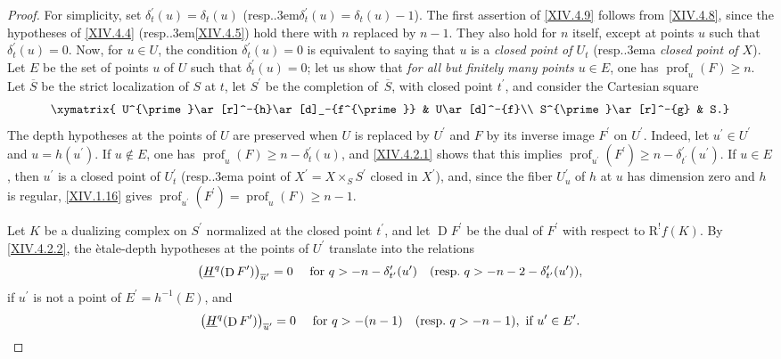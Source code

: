 \documentclass[11pt,a4paper,oneside]{book}
\providecommand{\pageoriginale}{%
  \refstepcounter{pageoriginal}%
  \marginpar{\raggedright\footnotesize\bfseries\thepageoriginal}%
  \xspace}
\providecommand{\resp}{resp.\kern.3em}
\DeclareMathOperator{\D}{D}
\providecommand{\prof}{\operatorname{prof}}
\providecommand{\R}{\mathrm R}
\theoremstyle{plain}
\theoremstyle{definition}
\theoremstyle{remark}
\renewcommand{\Ref}[1]{\textup{\ref{#1}}}
\begin{document}
\begin{proof}
For simplicity, set $\delta_{t}^{\prime}(u)=\delta_{t}(u)$ (\resp $\delta_{t}^{\prime}(u)=\delta_{t}(u)-1$). The first assertion of \Ref{XIV.4.9} follows from \Ref{XIV.4.8}, since the hypotheses of \Ref{XIV.4.4} (\resp \Ref{XIV.4.5}) hold there with $n$ replaced by $n-1$. They also hold for $n$ itself, except at points $u$ such that $\delta_{t}^{\prime}(u)=0$. Now, for $u\in U$, the condition $\delta_{t}^{\prime}(u)=0$ is equivalent to saying that $u$ is a \emph{closed point of $U_t$} (\resp a \emph{closed point of $X$}). Let $E$ be the set of points $u$ of $U$ such that $\delta_{t}^{\prime}(u)=0$; let us show that \emph{for all but finitely many points $u\in E$}, one has $\prof_{u}(F)\geq n$. Let $\overline{S}$ be the strict localization of $S$ at $t$, let $S^{\prime}$ be the completion of~$\overline{S}$, with closed point $t^{\prime}$, and consider the Cartesian square
$$
\xymatrix{ U^{\prime}\ar[r]^-{h}\ar[d]_-{f^{\prime}} & U\ar[d]^-{f}\\
S^{\prime}\ar[r]^-{g} & S.}$$
The depth hypotheses at the points of $U$ are preserved when\pageoriginale $U$ is replaced by $U^{\prime}$ and $F$ by its inverse image $F^{\prime}$ on $U^{\prime}$. Indeed, let $u^{\prime}\in U^{\prime}$ and $u=h(u^{\prime})$. If $u\not\in E$, one has $\prof_{u}(F)\geq n-\delta_{t}^{\prime}(u)$, and \Ref{XIV.4.2.1} shows that this implies $\prof_{u^{\prime}}(F^{\prime})\geq n-\delta_{t^{\prime}}^{\prime}(u^{\prime})$. If $u\in E$, then $u^{\prime}$ is a closed point of $U_{t}^{\prime}$ (\resp a point of $X^{\prime}=X\times_{S}S^{\prime}$ closed in $X^{\prime}$), and, since the fiber $U_{u}^{\prime}$ of $h$ at $u$ has dimension zero and $h$ is regular, \Ref{XIV.1.16} gives $\prof_{u^{\prime}}(F^{\prime})=\prof_{u}(F)\geq n-1$.

Let $K$ be a dualizing complex on $S^{\prime}$ normalized at the closed point $t^{\prime}$, and let $\D F^{\prime}$ be the dual of $F^{\prime}$ with respect to $\R^{!}f(K)$. By \Ref{XIV.4.2.2}, the \`etale-depth hypotheses at the points of $U^{\prime}$ translate into the relations
$$
\big(\underline{H}^{q}(\D F^{\prime})\big)_{\overline{u}^{\prime}}=0\quad\textrm{ for }q>-n-\delta_{t^{\prime}}^{\prime}(u^{\prime})\quad(\textrm{\resp }q>-n-2-\delta_{t^{\prime}}^{\prime}(u^{\prime})),
$$
if $u^{\prime}$ is not a point of $E^{\prime}=h^{-1}(E)$, and
$$
\big(\underline{H}^{q}(\D F^{\prime})\big)_{\overline{u}^{\prime}}=0\quad\textrm{ for }q>-(n-1)\quad(\textrm{\resp }q>-n-1), \textrm{ if }u^{\prime}\in E^{\prime}.
$$


\end{proof}
\end{document}
